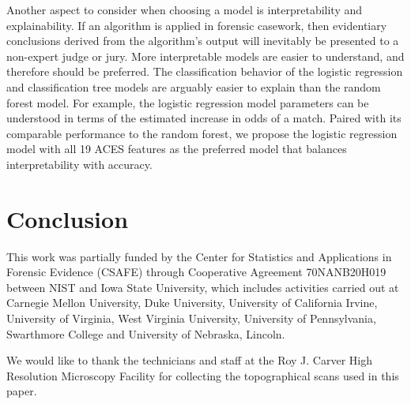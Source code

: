 \documentclass[reprint]{JASA}
\begin{document}
Another aspect to consider when choosing a model is interpretability and
explainability. If an algorithm is applied in forensic casework, then
evidentiary conclusions derived from the algorithm's output will
inevitably be presented to a non-expert judge or jury. More
interpretable models are easier to understand, and therefore should be
preferred. The classification behavior of the logistic regression and
classification tree models are arguably easier to explain than the
random forest model. For example, the logistic regression model
parameters can be understood in terms of the estimated increase in odds
of a match. Paired with its comparable performance to the random forest,
we propose the logistic regression model with all 19 ACES features as
the preferred model that balances interpretability with accuracy.

\hypertarget{conclusion}{%
\section{Conclusion}\label{conclusion}}

\begin{acknowledgments}
This work was partially funded by the Center for Statistics and
Applications in Forensic Evidence (CSAFE) through Cooperative Agreement
70NANB20H019 between NIST and Iowa State University, which includes
activities carried out at Carnegie Mellon University, Duke University,
University of California Irvine, University of Virginia, West Virginia
University, University of Pennsylvania, Swarthmore College and
University of Nebraska, Lincoln.

We would like to thank the technicians and staff at the Roy J. Carver
High Resolution Microscopy Facility for collecting the topographical
scans used in this paper.

\end{acknowledgments}
\end{document}
